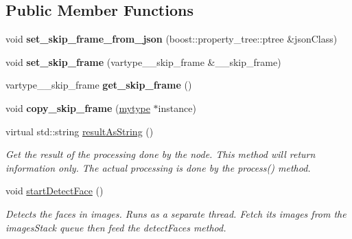 \subsection*{Public Member Functions}
\begin{DoxyCompactItemize}
\item 
\mbox{\label{classfilter_1_1algos_1_1_face_landmark_aeb2c21e10e7f75419f36057b4d939bea}} 
void {\bfseries set\+\_\+skip\+\_\+frame\+\_\+from\+\_\+json} (boost\+::property\+\_\+tree\+::ptree \&json\+Class)
\item 
\mbox{\label{classfilter_1_1algos_1_1_face_landmark_a28e8e33777606e43275cfafe3aebcc05}} 
void {\bfseries set\+\_\+skip\+\_\+frame} (vartype\+\_\+\+\_\+skip\+\_\+frame \&\+\_\+\+\_\+skip\+\_\+frame)
\item 
\mbox{\label{classfilter_1_1algos_1_1_face_landmark_ab681a83019eadfd6602896c023232858}} 
vartype\+\_\+\+\_\+skip\+\_\+frame {\bfseries get\+\_\+skip\+\_\+frame} ()
\item 
\mbox{\label{classfilter_1_1algos_1_1_face_landmark_a423be6eed67a3655a82a21586de7402f}} 
void {\bfseries copy\+\_\+skip\+\_\+frame} (\hyperlink{classfilter_1_1algos_1_1_face_landmark}{mytype} $\ast$instance)
\item 
virtual std\+::string \hyperlink{classfilter_1_1algos_1_1_face_landmark_a58eca9d87717bac1696c2b008af4342a}{result\+As\+String} ()
\begin{DoxyCompactList}\small\item\em Get the result of the processing done by the node. This method will return information only. The actual processing is done by the process() method. \end{DoxyCompactList}\item 
\mbox{\label{classfilter_1_1algos_1_1_face_landmark_a09244ac23fa2ba1c7a22c1a145cc9d58}} 
void \hyperlink{classfilter_1_1algos_1_1_face_landmark_a09244ac23fa2ba1c7a22c1a145cc9d58}{start\+Detect\+Face} ()
\begin{DoxyCompactList}\small\item\em Detects the faces in images. Runs as a separate thread. Fetch its images from the images\+Stack queue then feed the detect\+Faces method. \end{DoxyCompactList}\item 

\end{DoxyCompactItemize}
